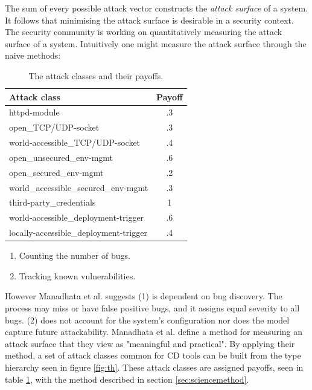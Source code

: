 The sum of every possible attack vector constructs the \textit{attack surface} of a system. It follows that minimising the attack surface is desirable\cite[p.~1]{as} in a security context. The security community is working on quantitatively measuring the attack surface of a system. Intuitively one might measure the attack surface through the naive methods:

\begin{table}
    \vspace{-2cm}
    \begin{tabularx}{7.65cm}{| X | c |}
        \hline
        \textbf{Attack class}                  & \textbf{Payoff}\\ \hline \hline
        httpd-module                           & .3\\ \hline
        open\_TCP/UDP-socket                   & .3\\ \hline
        world-accessible\_TCP/UDP-socket       & .4\\ \hline
        open\_unsecured\_env-mgmt              & .6\\ \hline
        open\_secured\_env-mgmt                & .2\\ \hline
        world\_accessible\_secured\_env-mgmt   & .3\\ \hline
        third-party\_credentials               & 1 \\ \hline
        world-accessible\_deployment-trigger   & .6\\ \hline
        locally-accessible\_deployment-trigger & .4\\ \hline
    \end{tabularx}
    \caption{The attack classes and their payoffs.}
    \label{fig:payoff}
\end{table}

\begin{enumerate}
    \item Counting the number of bugs.
    \item Tracking known vulnerabilities.
\end{enumerate}

However Manadhata et al.\cite{as} suggests (1) is dependent on bug discovery. The process may miss or have false positive bugs, and it assigns equal severity to all bugs. (2) does not account for the system's configuration nor does the model capture future attackability. Manadhata et al. define\cite{as} a method for measuring an attack surface that they view as "meaningful and practical". By applying their method, a set of attack classes common for \acrshort{CD} tools can be built from the type hierarchy seen in figure \ref{fig:th}. These attack classes are assigned payoffs, seen in table \ref{fig:payoff}, with the method described in section \ref{sec:sciencemethod}. 

